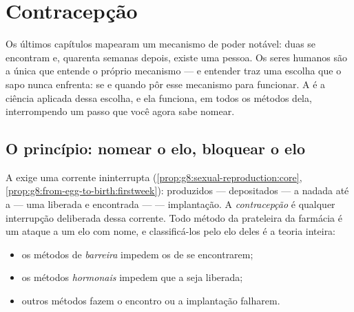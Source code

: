\chapter{Contracepção}\label{ch:g8:contraception}

Os últimos capítulos mapearam um mecanismo de poder notável: duas
 se encontram e, quarenta semanas depois, existe uma pessoa. Os
seres humanos são a única  que entende o próprio mecanismo --- e
entender traz uma escolha que o sapo nunca enfrenta: se e quando pôr
esse mecanismo para funcionar. A \emph{} é a ciência
aplicada dessa escolha, e ela funciona, em todos os métodos dela,
interrompendo um passo que você agora sabe nomear.

\section{O princípio: nomear o elo, bloquear o elo}

\begin{proposition}\label{prop:g8:contraception:principle}
A  exige uma corrente ininterrupta
(\cref{prop:g8:sexual-reproduction:core},
\cref{prop:g8:from-egg-to-birth:firstweek}):  produzidos ---
 depositados --- a nadada até a  --- uma
 liberada e encontrada ---  ---
implantação. A \emph{contracepção} é qualquer
interrupção deliberada dessa corrente. Todo método da prateleira da
farmácia é um ataque a um elo com nome, e classificá-los pelo elo
deles é a teoria inteira:
\begin{itemize}
  \item os métodos de \emph{barreira} impedem os  de se
        encontrarem;
  \item os métodos \emph{hormonais} impedem que a  seja liberada;
  \item outros métodos fazem o encontro ou a implantação falharem.
\end{itemize}
\end{proposition}
\admitted

